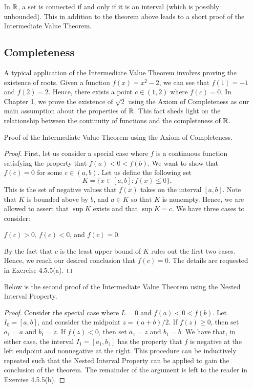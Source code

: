In \( \mathbb{R}  \), a set is connected if and only if it is an interval (which is possibly unbounded). This in addition to the theorem above leads to a short proof of the Intermediate Value Theorem. 

\subsection{Completeness}

A typical application of the Intermediate Value Theorem involves proving the existence of roots. Given a function \( f(x) = x^2 - 2  \), we can see that \( f(1) = -1  \) and \( f(2) = 2  \). Hence, there exists a point \( c \in (1,2) \) where \( f(c) = 0  \). In Chapter 1, we prove the existence of \( \sqrt{ 2 }  \) using the Axiom of Completeness as our main assumption about the properties of \( \mathbb{R}  \). This fact sheds light on the relationship between the continuity of functions and the completeness of \( \mathbb{R}  \).

Proof of the Intermediate Value Theorem using the Axiom of Completeness.
\begin{proof}
First, let us consider a special case where \( f  \) is a continuous function satisfying the property that \( f(a) < 0 < f(b) \). We want to show that \( f(c) = 0  \) for some \( c \in (a,b) \). Let us define the following set 
\[  K = \{ x \in [a,b] : f(x) \leq 0  \}. \]
This is the set of negative values that \( f(x) \) takes on the interval \( [a,b] \). Note that \( K  \) is bounded above by \( b \), and \( a \in K  \) so that \(  K \) is nonempty. Hence, we are allowed to assert that \( \sup K  \) exists and that \( \sup K = c  \). We have three cases to consider: 
\begin{center}
    \( f(c) > 0  \), \( f(c) < 0  \), and \( f(c) = 0  \).
\end{center}
By the fact that \( c  \) is the least upper bound of \( K  \) rules out the first two cases. Hence, we reach our desired conclusion that \( f(c) = 0  \). The details are requested in Exercise 4.5.5(a).
\end{proof}

Below is the second proof of the Intermediate Value Theorem using the Nested Interval Property.

\begin{proof}
    Consider the special case where \( L = 0  \) and \( f(a) < 0 < f(b) \). Let \( I_0 = [a,b] \), and consider the midpoint \( z = (a+b)/ 2  \). If \( f(z) \geq 0  \), then set \( a_1 = a  \) and \( b_1 = z  \). If \( f(z) < 0  \), then set \( a_1 = z  \) and \( b_1 = b  \). We have that, in either case, the interval \( I_1 =  [a_1, b_1 ] \) has the property that \( f  \) is negative at the left endpoint and nonnegative at the right. This procedure can be inductively repeated such that the Nested Interval Property can be applied to gain the conclusion of the theorem. The remainder of the argument is left to the reader in Exercise 4.5.5(b).
\end{proof}

